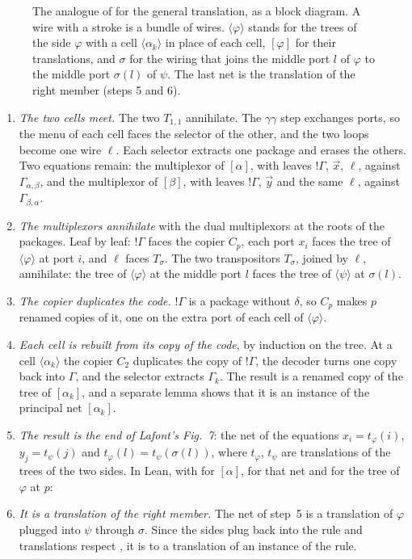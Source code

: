 \documentclass[11pt,a4paper]{article}
\newcommand{\lean}[1]{%
  \VerbatimInput[frame=single,rulecolor=\color{codeframe},framesep=1.6mm,breaklines=true,
    breakanywhere=false,breaksymbolleft={},samepage=true,fontsize=\fontsize{7.4}{9.0}\selectfont]{snip/#1.lean}}
\newcommand{\Equiv}{\cod{Equiv}}
\newcommand{\pp}[1]{\cite[#1]{lafont1997}}
\begin{document}
\begin{figure}[H]
\centering

\caption{The analogue of \pp{Fig.~7} for the general translation, as a block diagram. A wire
with a stroke is a bundle of wires. $\langle\varphi\rangle$ stands for the trees of the side
$\varphi$ with a cell $\langle\alpha_k\rangle$ in place of each cell, $[\varphi]$ for their
translations, and $\sigma$ for the wiring that joins the middle port $l$ of $\varphi$ to the
middle port $\sigma(l)$ of $\psi$. The last net is the translation of the right member
(steps 5 and 6).}
\label{fig:reader}
\end{figure}

\begin{enumerate}
\item \emph{The two cells meet.} The two $T_{1,1}$ annihilate. The $\gamma\gamma$ step
  exchanges ports, so the menu of each cell faces the selector of the other, and the two loops
  become one wire $\ell$. Each selector extracts one package and erases the others. Two
  equations remain: the multiplexor of $[\alpha]$, with leaves $!\Gamma$, $\vec x$, $\ell$,
  against $\Gamma_{\alpha,\beta}$, and the multiplexor of $[\beta]$, with leaves $!\Gamma$,
  $\vec y$ and the same $\ell$, against $\Gamma_{\beta,\alpha}$.
\item \emph{The multiplexors annihilate} with the dual multiplexors at the roots of the
  packages. Leaf by leaf: $!\Gamma$ faces the copier $C_p$, each port $x_i$ faces the tree of
  $\langle\varphi\rangle$ at port $i$, and $\ell$ faces $T_\sigma$. The two transpositors
  $T_\sigma$, joined by $\ell$, annihilate: the tree of $\langle\varphi\rangle$ at the middle
  port $l$ faces the tree of $\langle\psi\rangle$ at $\sigma(l)$.
\item \emph{The copier duplicates the code.} $!\Gamma$ is a package without $\delta$, so $C_p$
  makes $p$ renamed copies of it, one on the extra port of each cell of
  $\langle\varphi\rangle$.
\item \emph{Each cell is rebuilt from its copy of the code}, by induction on the tree. At a
  cell $\langle\alpha_k\rangle$ the copier $C_2$ duplicates the copy of $!\Gamma$, the decoder
  turns one copy back into $\Gamma$, and the selector extracts $\Gamma_k$. The result is a
  renamed copy of the tree of $[\alpha_k]$, and a separate lemma shows that it is an instance
  of the principal net $[\alpha_k]$.
\item \emph{The result is the end of Lafont's Fig.~7}: the net of the equations $x_i =
  t_\varphi(i)$, $y_j = t_\psi(j)$ and $t_\varphi(l) = t_\psi(\sigma(l))$, where $t_\varphi$,
  $t_\psi$ are translations of the trees of the two sides. In Lean, with 
  for $[\alpha]$,  for that net and  for the tree of
  $\varphi$ at $p$:
  \lean{cells_plug}
\item \emph{It is a translation of the right member.} The net of step~5 is a translation of
  $\varphi$ plugged into $\psi$ through $\sigma$. Since the sides plug back into the rule and
  translations respect \Equiv{}, it is \Equiv{} to a translation of an instance of the rule.
\end{enumerate}
\end{document}

